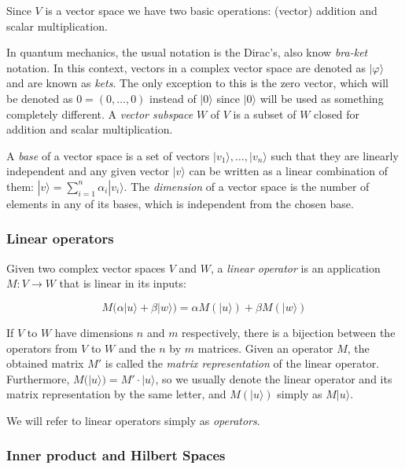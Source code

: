 \documentclass{article}
\begin{document}
	Since $V$ is a vector space we have two basic operations: (vector) addition and scalar multiplication.
	
	In quantum mechanics, the usual notation is the Dirac's, also know \emph{bra-ket} notation. In this context, vectors in a complex vector space are denoted as $|\varphi\rangle$ and are known as \emph{kets}. The only exception to this is the zero vector, which will be denoted as $0 = (0, \dotsc, 0)$ instead of $|0\rangle$ since $|0\rangle$ will be used as something completely different. A \emph{vector subspace} $W$ of $V$ is a subset of $W$ closed for addition and scalar multiplication.
	
	A \emph{base} of a vector space is a set of vectors $|v_1\rangle, \dotsc, |v_n\rangle$ such that they are linearly independent and any given vector $|v\rangle$ can be written as a linear combination of them: $|v\rangle = \sum_{i=1}^n \alpha_i|v_i\rangle$. The \emph{dimension} of a vector space is the number of elements in any of its bases, which is independent from the chosen base.
	
	
	\subsubsection{Linear operators}
	
	
	\begin{definition}
		Given two complex vector spaces $V$ and $W$, a \emph{linear operator} is an application $M: V \rightarrow W $ that is linear in its inputs:
		
		$$ M \Big( \alpha |u\rangle + \beta |w\rangle \Big) = \alpha M (|u\rangle) + \beta M (|w\rangle) $$
	\end{definition}
	
	If $V$ to $W$ have dimensions $n$ and $m$ respectively, there is a bijection between the operators from $V$ to $W$ and the $n$ by $m$ matrices. Given an operator $M$, the obtained matrix $M'$ is called the \emph{matrix representation} of the linear operator. Furthermore, $M(|u\rangle) = M' \cdot |u\rangle$, so we usually denote the linear operator and its matrix representation by the same letter, and $M(|u\rangle)$ simply as $M|u\rangle$.
	
	We will refer to linear operators simply as \emph{operators}.
	
	
	\subsubsection{Inner product and Hilbert Spaces}
	
\end{document}
